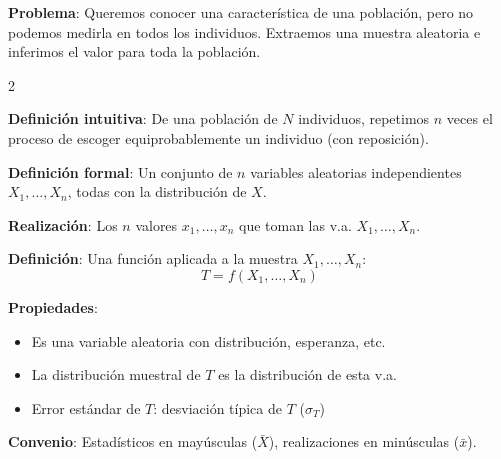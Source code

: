 \documentclass[10pt,a4paper]{article}
\begin{document}
\pagebreak


\begin{tcolorbox}[title=Estadística Inferencial]
    \textbf{Problema}: Queremos conocer una característica de una población, pero no podemos medirla en todos los individuos. Extraemos una muestra aleatoria e inferimos el valor para toda la población.
\end{tcolorbox}

\begin{multicols}{2}
    \begin{tcolorbox}[title=Muestra Aleatoria Simple (m.a.s.), equal height group=EST1]
        \textbf{Definición intuitiva}: De una población de $N$ individuos, repetimos $n$ veces el proceso de escoger equiprobablemente un individuo (con reposición).
        
        \textbf{Definición formal}: Un conjunto de $n$ variables aleatorias independientes $X_1, \ldots, X_n$, todas con la distribución de $X$.
        
        \textbf{Realización}: Los $n$ valores $x_1, \ldots, x_n$ que toman las v.a. $X_1, \ldots, X_n$.
    \end{tcolorbox}
    \begin{tcolorbox}[title=Estadístico (Estimador Puntual), equal height group=EST1]
        \textbf{Definición}: Una función aplicada a la muestra $X_1, \ldots, X_n$:
        \[
            T = f(X_1, \ldots, X_n)
        \]
        
        \textbf{Propiedades}:
        \begin{itemize}
            \item Es una variable aleatoria con distribución, esperanza, etc.
            \item La distribución muestral de $T$ es la distribución de esta v.a.
            \item Error estándar de $T$: desviación típica de $T$ ($\sigma_T$)
        \end{itemize}
        
        \textbf{Convenio}: Estadísticos en mayúsculas ($\bar{X}$), realizaciones en minúsculas ($\bar{x}$).
    \end{tcolorbox}
\end{multicols}
\end{document}
